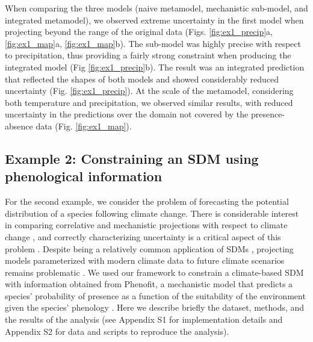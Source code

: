 \documentclass[11pt]{article}
\newcommand{\rev}[1]{{\color{RoyalBlue}#1}}
\begin{document}
When comparing the three models (naive metamodel, mechanistic sub-model, and integrated metamodel), we observed extreme uncertainty in the first model when projecting beyond the range of the original data (Figs. \ref{fig:ex1_precip}a, \ref{fig:ex1_map}a, \ref{fig:ex1_map}b).
The sub-model was highly precise with respect to precipitation, thus providing a fairly strong constraint when producing the integrated model (Fig \ref{fig:ex1_precip}b).
The result was an integrated prediction that reflected the shapes of both models and showed considerably reduced uncertainty (Fig. \ref{fig:ex1_precip}).
At the scale of the metamodel, considering both temperature and precipitation, we observed similar results, with reduced uncertainty in the predictions over the domain not covered by the presence-absence data (Fig. \ref{fig:ex1_map}).


%
%


\subsection*{Example 2: Constraining an SDM using phenological information}
For the second example, we consider the problem of forecasting the potential distribution of a species following climate change.
There is considerable interest in comparing correlative and mechanistic projections with respect to climate change \citep{Morin2009}, and correctly characterizing uncertainty is a critical aspect of this problem \citep{Cheaib2012}.
Despite being a relatively common application of SDMs \citep{Guisan2005}, projecting models parameterized with modern climate data to future climate scenarios remains problematic \citep{Araujo2006}.
We used our framework to constrain a climate-based SDM with information obtained from Phenofit, a mechanistic model that predicts a species' probability of presence as a function of the suitability of the environment given the species' phenology \citep{Chuine2001, Morin2009}.
Here we describe briefly the dataset, methods, and the results of the analysis (see \rev{ Appendix S1 for implementation details and Appendix S2} for data and scripts to reproduce the analysis).
\end{document}
